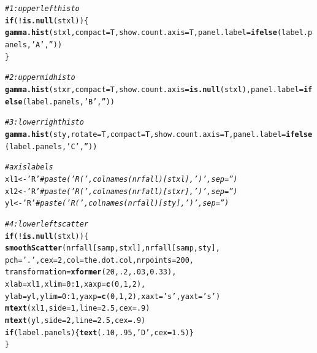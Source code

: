 \documentclass{article}\usepackage[]{graphicx}\usepackage[]{color}
\makeatletter
\newcommand{\hlnum}[1]{\textcolor[rgb]{0.686,0.059,0.569}{#1}}%
\newcommand{\hlstr}[1]{\textcolor[rgb]{0.192,0.494,0.8}{#1}}%
\newcommand{\hlcom}[1]{\textcolor[rgb]{0.678,0.584,0.686}{\textit{#1}}}%
\newcommand{\hlopt}[1]{\textcolor[rgb]{0,0,0}{#1}}%
\newcommand{\hlstd}[1]{\textcolor[rgb]{0.345,0.345,0.345}{#1}}%
\newcommand{\hlkwa}[1]{\textcolor[rgb]{0.161,0.373,0.58}{\textbf{#1}}}%
\newcommand{\hlkwb}[1]{\textcolor[rgb]{0.69,0.353,0.396}{#1}}%
\newcommand{\hlkwc}[1]{\textcolor[rgb]{0.333,0.667,0.333}{#1}}%
\newcommand{\hlkwd}[1]{\textcolor[rgb]{0.737,0.353,0.396}{\textbf{#1}}}%
\newenvironment{kframe}{%
 \def\at@end@of@kframe{}%
 \ifinner\ifhmode%
  \def\at@end@of@kframe{\end{minipage}}%
  \begin{minipage}{\columnwidth}%
 \fi\fi%
 \def\FrameCommand##1{\hskip\@totalleftmargin \hskip-\fboxsep
 \colorbox{shadecolor}{##1}\hskip-\fboxsep
     \hskip-\linewidth \hskip-\@totalleftmargin \hskip\columnwidth}%
 \MakeFramed {\advance\hsize-\width
   \@totalleftmargin\z@ \linewidth\hsize
   \@setminipage}}%
 {\par\unskip\endMakeFramed%
 \at@end@of@kframe}
\newenvironment{knitrout}{}{} %
\makeatother
\begin{document}
\begin{knitrout}
\begin{kframe}
\begin{alltt}
  \hlcom{# 1: upper left histo}
  \hlkwa{if}\hlstd{(}\hlopt{!}\hlkwd{is.null}\hlstd{(stxl))\{}
    \hlkwd{gamma.hist}\hlstd{(stxl,}\hlkwc{compact}\hlstd{=T,} \hlkwc{show.count.axis}\hlstd{=T,} \hlkwc{panel.label}\hlstd{=}\hlkwd{ifelse}\hlstd{(label.panels,}\hlstr{'A'}\hlstd{,}\hlstr{''}\hlstd{))}
  \hlstd{\}}

  \hlcom{# 2: upper mid histo}
  \hlkwd{gamma.hist}\hlstd{(stxr,}\hlkwc{compact}\hlstd{=T,} \hlkwc{show.count.axis}\hlstd{=}\hlkwd{is.null}\hlstd{(stxl),} \hlkwc{panel.label}\hlstd{=}\hlkwd{ifelse}\hlstd{(label.panels,}\hlstr{'B'}\hlstd{,}\hlstr{''}\hlstd{))}

  \hlcom{# 3: lower right histo}
  \hlkwd{gamma.hist}\hlstd{(sty,}\hlkwc{rotate}\hlstd{=T,}\hlkwc{compact}\hlstd{=T,} \hlkwc{show.count.axis}\hlstd{=T,} \hlkwc{panel.label}\hlstd{=}\hlkwd{ifelse}\hlstd{(label.panels,}\hlstr{'C'}\hlstd{,}\hlstr{''}\hlstd{))}

  \hlcom{# axis labels}
  \hlstd{xl1} \hlkwb{<-} \hlstr{'R'} \hlcom{# paste('R (',colnames(nrfall)[stxl], ')',sep='') }
  \hlstd{xl2} \hlkwb{<-} \hlstr{'R'} \hlcom{# paste('R (',colnames(nrfall)[stxr], ')',sep='') }
  \hlstd{yl}  \hlkwb{<-} \hlstr{'R'} \hlcom{# paste('R (',colnames(nrfall)[sty],  ')',sep='') }

  \hlcom{# 4: lower left scatter}
  \hlkwa{if}\hlstd{(}\hlopt{!}\hlkwd{is.null}\hlstd{(stxl))\{}
    \hlkwd{smoothScatter}\hlstd{(nrfall[samp,stxl], nrfall[samp,sty],}
                  \hlkwc{pch}\hlstd{=}\hlstr{'.'}\hlstd{,} \hlkwc{cex}\hlstd{=}\hlnum{2}\hlstd{,} \hlkwc{col}\hlstd{=the.dot.col,} \hlkwc{nrpoints}\hlstd{=}\hlnum{200}\hlstd{,}
                  \hlkwc{transformation}\hlstd{=}\hlkwd{xformer}\hlstd{(}\hlnum{20}\hlstd{,}\hlnum{.2}\hlstd{,}\hlnum{.03}\hlstd{,}\hlnum{0.33}\hlstd{),}
                  \hlkwc{xlab}\hlstd{=xl1,} \hlkwc{xlim}\hlstd{=}\hlnum{0}\hlopt{:}\hlnum{1}\hlstd{,} \hlkwc{xaxp}\hlstd{=}\hlkwd{c}\hlstd{(}\hlnum{0}\hlstd{,}\hlnum{1}\hlstd{,}\hlnum{2}\hlstd{),}
                  \hlkwc{ylab}\hlstd{=yl,}  \hlkwc{ylim}\hlstd{=}\hlnum{0}\hlopt{:}\hlnum{1}\hlstd{,} \hlkwc{yaxp}\hlstd{=}\hlkwd{c}\hlstd{(}\hlnum{0}\hlstd{,}\hlnum{1}\hlstd{,}\hlnum{2}\hlstd{),}\hlkwc{xaxt}\hlstd{=}\hlstr{'s'}\hlstd{,}\hlkwc{yaxt}\hlstd{=}\hlstr{'s'}\hlstd{)}
    \hlkwd{mtext}\hlstd{(xl1,}\hlkwc{side}\hlstd{=}\hlnum{1}\hlstd{,} \hlkwc{line}\hlstd{=}\hlnum{2.5}\hlstd{,} \hlkwc{cex}\hlstd{=}\hlnum{.9}\hlstd{)}
    \hlkwd{mtext}\hlstd{(yl,} \hlkwc{side}\hlstd{=}\hlnum{2}\hlstd{,} \hlkwc{line}\hlstd{=}\hlnum{2.5}\hlstd{,} \hlkwc{cex}\hlstd{=}\hlnum{.9}\hlstd{)}
    \hlkwa{if}\hlstd{(label.panels)\{}\hlkwd{text}\hlstd{(}\hlnum{.10}\hlstd{,} \hlnum{.95}\hlstd{,} \hlstr{'D'}\hlstd{,} \hlkwc{cex}\hlstd{=}\hlnum{1.5}\hlstd{)\}}
  \hlstd{\}}


\end{alltt}
\end{kframe}
\end{knitrout}
\end{document}

